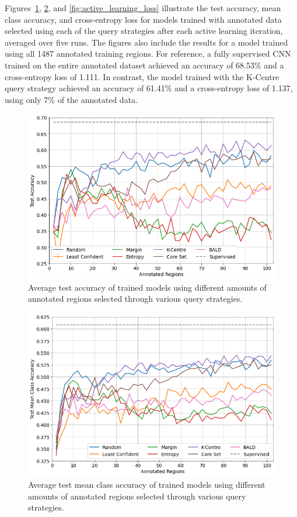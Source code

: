 \newpage
Figures~\ref{fig:active_learning_accuracy}, \ref{fig:active_learning_mean_class_accuracy}, and \ref{fig:active_learning_loss} illustrate the test accuracy, mean class accuracy, and cross-entropy loss for models trained with annotated data selected using each of the query strategies after each active learning iteration, averaged over five runs. The figures also include the results for a model trained using all 1487 annotated training regions. For reference, a fully supervised CNN trained on the entire annotated dataset achieved an accuracy of 68.53\% and a cross-entropy loss of 1.111. In contrast, the model trained with the K-Centre query strategy achieved an accuracy of 61.41\% and a cross-entropy loss of 1.137, using only 7\% of the annotated data.

\begin{figure}
	\centering
	\includegraphics[width=\textwidth]{images/active_learning_accuracy.png}
	\caption{Average test accuracy of trained models using different amounts of annotated regions selected through various query strategies.}
	\label{fig:active_learning_accuracy}
\end{figure}

\begin{figure}
	\centering
	\includegraphics[width=\textwidth]{images/active_learning_mean_class_accuracy.png}
	\caption{Average test mean class accuracy of trained models using different amounts of annotated regions selected through various query strategies.}
	\label{fig:active_learning_mean_class_accuracy}
\end{figure}


